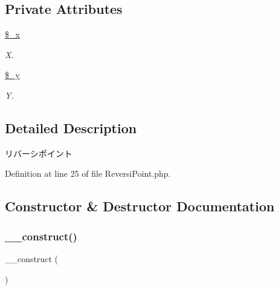 \subsection*{Private Attributes}
\begin{DoxyCompactItemize}
\item 
\mbox{\label{class_reversi_point_ae57ae417aad3990d032c704748364c74}} 
\hyperlink{class_reversi_point_ae57ae417aad3990d032c704748364c74}{\$\+\_\+x}
\begin{DoxyCompactList}\small\item\em X. \end{DoxyCompactList}\item 
\mbox{\label{class_reversi_point_a44b74e71d07c6bff218f62d98547a399}} 
\hyperlink{class_reversi_point_a44b74e71d07c6bff218f62d98547a399}{\$\+\_\+y}
\begin{DoxyCompactList}\small\item\em Y. \end{DoxyCompactList}\end{DoxyCompactItemize}


\subsection{Detailed Description}
リバーシポイント 

Definition at line 25 of file Reversi\+Point.\+php.



\subsection{Constructor \& Destructor Documentation}
\mbox{\label{class_reversi_point_a095c5d389db211932136b53f25f39685}} 
\subsubsection{\texorpdfstring{\+\_\+\+\_\+construct()}{\_\_construct()}}
{\footnotesize\ttfamily \+\_\+\+\_\+construct (\begin{DoxyParamCaption}{ }\end{DoxyParamCaption})}



